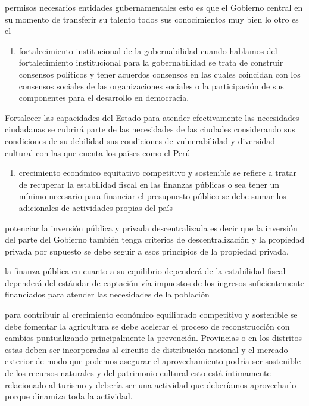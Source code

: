 \documentclass[
  a4paper,
]{article}
\providecommand{\tightlist}{%
  \setlength{\itemsep}{0pt}\setlength{\parskip}{0pt}}\usepackage{longtable,booktabs,array}
\begin{document}
permisos necesarios entidades gubernamentales esto es que el Gobierno
central en su momento de transferir su talento todos sus conocimientos
muy bien lo otro es el

\begin{enumerate}
\def\labelenumi{\arabic{enumi}.}
\setcounter{enumi}{1}
\tightlist
\item
  fortalecimiento institucional de la gobernabilidad cuando hablamos del
  fortalecimiento institucional para la gobernabilidad se trata de
  construir consensos políticos y tener acuerdos consensos en las cuales
  coincidan con los consensos sociales de las organizaciones sociales o
  la participación de sus componentes para el desarrollo en democracia.
\end{enumerate}

Fortalecer las capacidades del Estado para atender efectivamente las
necesidades ciudadanas se cubrirá parte de las necesidades de las
ciudades considerando sus condiciones de su debilidad sus condiciones de
vulnerabilidad y diversidad cultural con las que cuenta los países como
el Perú

\begin{enumerate}
\def\labelenumi{\arabic{enumi}.}
\setcounter{enumi}{2}
\tightlist
\item
  crecimiento económico equitativo competitivo y sostenible se refiere a
  tratar de recuperar la estabilidad fiscal en las finanzas públicas o
  sea tener un mínimo necesario para financiar el presupuesto público se
  debe sumar los adicionales de actividades propias del país
\end{enumerate}

potenciar la inversión pública y privada descentralizada es decir que la
inversión del parte del Gobierno también tenga criterios de
descentralización y la propiedad privada por supuesto se debe seguir a
esos principios de la propiedad privada.

la finanza pública en cuanto a su equilibrio dependerá de la estabilidad
fiscal dependerá del estándar de captación vía impuestos de los ingresos
suficientemente financiados para atender las necesidades de la población

para contribuir al crecimiento económico equilibrado competitivo y
sostenible se debe fomentar la agricultura se debe acelerar el proceso
de reconstrucción con cambios puntualizando principalmente la
prevención. Provincias o en los distritos estas deben ser incorporadas
al circuito de distribución nacional y el mercado exterior de modo que
podemos asegurar el aprovechamiento podría ser sostenible de los
recursos naturales y del patrimonio cultural esto está íntimamente
relacionado al turismo y debería ser una actividad que deberíamos
aprovecharlo porque dinamiza toda la actividad.
\end{document}
